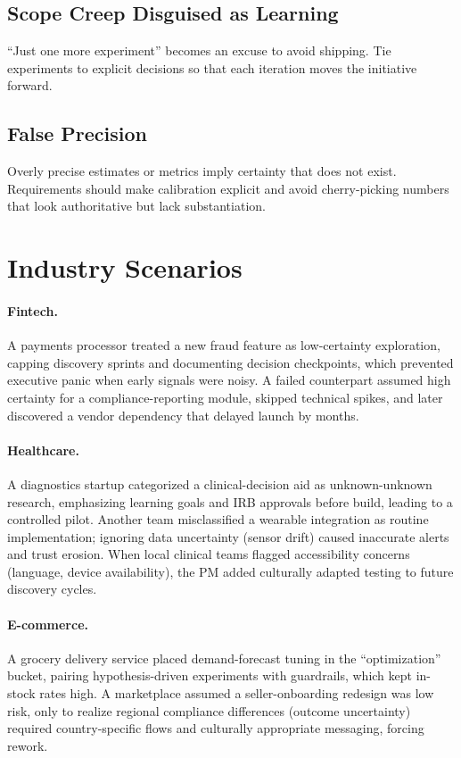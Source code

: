\subsection{Scope Creep Disguised as Learning}
``Just one more experiment'' becomes an excuse to avoid shipping. Tie experiments to explicit decisions so that each iteration moves the initiative forward.

\subsection{False Precision}
Overly precise estimates or metrics imply certainty that does not exist. Requirements should make calibration explicit and avoid cherry-picking numbers that look authoritative but lack substantiation.

\section{Industry Scenarios}
\label{sec:uncertainty-industry}

\paragraph{Fintech.} A payments processor treated a new fraud feature as low-certainty exploration, capping discovery sprints and documenting decision checkpoints, which prevented executive panic when early signals were noisy. A failed counterpart assumed high certainty for a compliance-reporting module, skipped technical spikes, and later discovered a vendor dependency that delayed launch by months.

\paragraph{Healthcare.} A diagnostics startup categorized a clinical-decision aid as unknown-unknown research, emphasizing learning goals and IRB approvals before build, leading to a controlled pilot. Another team misclassified a wearable integration as routine implementation; ignoring data uncertainty (sensor drift) caused inaccurate alerts and trust erosion. When local clinical teams flagged accessibility concerns (language, device availability), the PM added culturally adapted testing to future discovery cycles.

\paragraph{E-commerce.} A grocery delivery service placed demand-forecast tuning in the ``optimization'' bucket, pairing hypothesis-driven experiments with guardrails, which kept in-stock rates high. A marketplace assumed a seller-onboarding redesign was low risk, only to realize regional compliance differences (outcome uncertainty) required country-specific flows and culturally appropriate messaging, forcing rework.

